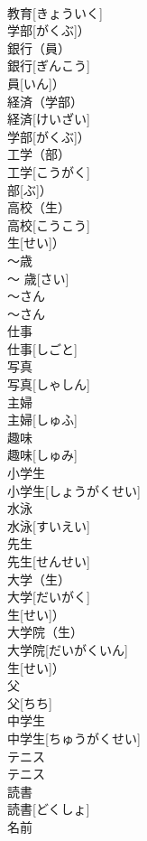 \documentclass[8pt]{extreport}
\begin{document}
\begin{CJK}{UTF8}{min}
\\	教育[きょういく]
\\	学部[がくぶ]）		
\\	銀行（員）	
\\	銀行[ぎんこう]
\\	員[いん]）		
\\	経済（学部）	
\\	経済[けいざい]
\\	学部[がくぶ]）		
\\	工学（部）	
\\	工学[こうがく]
\\	部[ぶ]）		
\\	高校（生）	
\\	高校[こうこう]
\\	生[せい]）		
\\	〜歳	
\\	〜 歳[さい]		
\\	〜さん	
\\	〜さん		
\\	仕事	
\\	仕事[しごと]		
\\	写真	
\\	写真[しゃしん]		
\\	主婦	
\\	主婦[しゅふ]		
\\	趣味	
\\	趣味[しゅみ]		
\\	小学生	
\\	小学生[しょうがくせい]		
\\	水泳	
\\	水泳[すいえい]		
\\	先生	
\\	先生[せんせい]		
\\	大学（生）	
\\	大学[だいがく]
\\	生[せい]）		
\\	大学院（生）	
\\	大学院[だいがくいん]
\\	生[せい]）		
\\	父	
\\	父[ちち]		
\\	中学生	
\\	中学生[ちゅうがくせい]		
\\	テニス	
\\	テニス		
\\	読書	
\\	読書[どくしょ]		
\\	名前	

\end{CJK}
\end{document}
